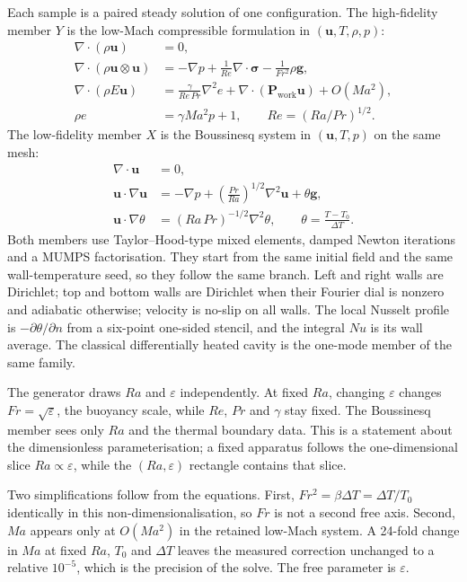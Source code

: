 \documentclass[preprint,11pt,a4paper,times]{elsarticle}
\begin{document}
Each sample is a paired steady solution of one configuration. The high-fidelity member $Y$ is
the low-Mach compressible formulation in $(\bm u,T,\rho,p)$:
\begin{align}
  \nabla\cdot(\rho\bm u)&=0,\label{eq:mass}\\
  \nabla\cdot(\rho\bm u\otimes\bm u)&=-\nabla p+\frac{1}{Re}\nabla\cdot\bm\sigma
  -\frac{1}{Fr^2}\rho\bm g,\label{eq:mom}\\
  \nabla\cdot(\rho E\bm u)&=\frac{\gamma}{Re\,Pr}\nabla^2 e
  +\nabla\cdot(\bm P_{\mathrm{work}}\bm u)+O(Ma^2),\label{eq:energy}\\
  \rho e&=\gamma Ma^2p+1,\qquad Re=(Ra/Pr)^{1/2}.\label{eq:eos}
\end{align}
The low-fidelity member $X$ is the Boussinesq system in $(\bm u,T,p)$ on the same mesh:
\begin{align}
  \nabla\cdot\bm u&=0,\label{eq:bqmass}\\
  \bm u\cdot\nabla\bm u&=-\nabla p+\left(\frac{Pr}{Ra}\right)^{1/2}\nabla^2\bm u
  +\theta\bm g,\label{eq:bqmom}\\
  \bm u\cdot\nabla\theta&=(Ra\,Pr)^{-1/2}\nabla^2\theta,\qquad
  \theta=\frac{T-T_0}{\Delta T}.\label{eq:bqtemp}
\end{align}
Both members use Taylor--Hood-type mixed elements, damped Newton iterations and a MUMPS
factorisation. They start from the same initial field and the same wall-temperature seed, so
they follow the same branch. Left and right walls are Dirichlet; top and bottom walls are
Dirichlet when their Fourier dial is nonzero and adiabatic otherwise; velocity is no-slip on
all walls. The local Nusselt profile is $-\partial\theta/\partial n$ from a six-point one-sided
stencil, and the integral $Nu$ is its wall average. The classical differentially heated cavity
is the one-mode member of the same family.

The generator draws $Ra$ and $\varepsilon$ independently. At fixed $Ra$, changing
$\varepsilon$ changes $Fr=\sqrt{\varepsilon}$, the buoyancy scale, while $Re$, $Pr$ and
$\gamma$ stay fixed. The Boussinesq member sees only $Ra$ and the thermal boundary data. This
is a statement about the dimensionless parameterisation; a fixed apparatus follows the
one-dimensional slice $Ra\propto\varepsilon$, while the $(Ra,\varepsilon)$ rectangle contains
that slice.

Two simplifications follow from the equations. First, $Fr^2=\beta\Delta T=\Delta T/T_0$
identically in this non-dimensionalisation, so $Fr$ is not a second free axis. Second, $Ma$
appears only at $O(Ma^2)$ in the retained low-Mach system. A 24-fold change in $Ma$ at fixed
$Ra$, $T_0$ and $\Delta T$ leaves the measured correction unchanged to a relative $10^{-5}$,
which is the precision of the solve. The free parameter is $\varepsilon$.
\end{document}
